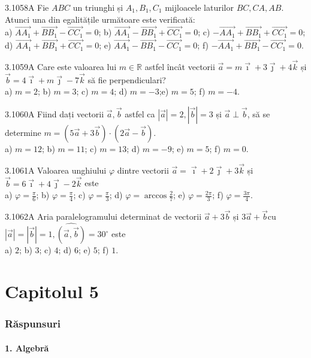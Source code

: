 \documentclass[11pt]{article}
\begin{document}
3.1058A Fie $A B C$ un triunghi și $A_{1}, B_{1}, C_{1}$ mijloacele laturilor $B C, C A, A B$. Atunci una din egalitățile următoare este verificată:\\ a) $\overrightarrow{A A_{1}}+\overrightarrow{B B_{1}}-\overrightarrow{C C_{1}}=0$; b) $\overrightarrow{A A_{1}}-\overrightarrow{B B_{1}}+\overrightarrow{C C_{1}}=0$; c) $-\overrightarrow{A A_{1}}+\overrightarrow{B B_{1}}+\overrightarrow{C C_{1}}=0$; d) $\overrightarrow{A A_{1}}+\overrightarrow{B B_{1}}+\overrightarrow{C C_{1}}=0$; e) $\overrightarrow{A A_{1}}-\overrightarrow{B B_{1}}-\overrightarrow{C C_{1}}=0$; f) $-\overrightarrow{A A_{1}}+\overrightarrow{B B_{1}}-\overrightarrow{C C_{1}}=0$.

3.1059A Care este valoarea lui $m \in \mathbb{R}$ astfel încât vectorii $\vec{a}=m \vec{\imath}+3 \vec{\jmath}+4 \vec{k}$ și $\vec{b}=4 \vec{\imath}+m \vec{\jmath}-7 \vec{k}$ să fie perpendiculari?\\ a) $m=2$; b) $m=3$; c) $m=4$; d) $m=-3$;e) $m=5$; f) $m=-4$.

3.1060A Fiind dați vectorii $\vec{a}, \vec{b}$ astfel ca $|\vec{a}|=2,|\vec{b}|=3$ și $\vec{a} \perp \vec{b}$, să se determine $m=(5 \vec{a}+3 \vec{b}) \cdot(2 \vec{a}-\vec{b})$.\\ a) $m=12$; b) $m=11$; c) $m=13$; d) $m=-9$; e) $m=5$; f) $m=0$.

3.1061A Valoarea unghiului $\varphi$ dintre vectorii $\vec{a}=\vec{\imath}+2 \vec{\jmath}+3 \vec{k}$ și $\vec{b}=6 \vec{\imath}+4 \vec{\jmath}-2 \vec{k}$ este\\ a) $\varphi=\frac{\pi}{6}$; b) $\varphi=\frac{\pi}{4}$; c) $\varphi=\frac{\pi}{3}$; d) $\varphi=\arccos \frac{2}{7}$; e) $\varphi=\frac{2 \pi}{3}$; f) $\varphi=\frac{3 \pi}{4}$.

3.1062A Aria paralelogramului determinat de vectorii $\vec{a}+3 \vec{b}$ și $3 \vec{a}+\vec{b} \mathrm{cu}$ $|\vec{a}|=|\vec{b}|=1, \widehat{(\vec{a}, \vec{b})}=30^{\circ}$ este\\ a) $2$; b) $3$; c) $4$; d) $6$; e) $5$; f) $1$.

\part*{Capitolul 5}
\section*{Răspunsuri}
\subsection*{1. Algebră}
\end{document}
